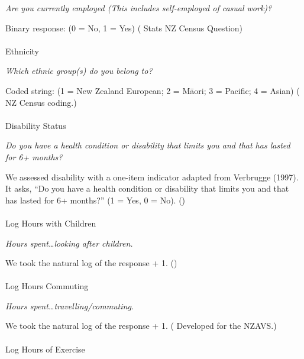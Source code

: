 \documentclass[
  single column]{article}
\makeatletter
\let\oldparagraph\paragraph
\renewcommand{\paragraph}{
    \@ifstar
      \xxxParagraphStar
      \xxxParagraphNoStar
  }
\newcommand{\xxxParagraphStar}[1]{\oldparagraph*{#1}\mbox{}}
\newcommand{\xxxParagraphNoStar}[1]{\oldparagraph{#1}\mbox{}}
\makeatother
\begin{document}
\emph{Are you currently employed (This includes self-employed of casual
work)?}

Binary response: (0 = No, 1 = Yes)
( Stats NZ Census
Question)

\paragraph{Ethnicity}\label{ethnicity}

\emph{Which ethnic group(s) do you belong to?}

Coded string: (1 = New Zealand European; 2 = Māori; 3 = Pacific; 4 =
Asian) ( NZ Census
coding.)

\paragraph{Disability Status}\label{disability-status}

\emph{Do you have a health condition or disability that limits you and
that has lasted for 6+ months?}

We assessed disability with a one-item indicator adapted from Verbrugge
(1997). It asks, ``Do you have a health condition or disability that
limits you and that has lasted for 6+ months?'' (1 = Yes, 0 = No).
()

\paragraph{Log Hours with Children}\label{log-hours-with-children}

\emph{Hours spent\ldots looking after children.}

We took the natural log of the response + 1.
()

\paragraph{Log Hours Commuting}\label{log-hours-commuting}

\emph{Hours spent\ldots travelling/commuting.}

We took the natural log of the response + 1.
( Developed for the
NZAVS.)

\paragraph{Log Hours of Exercise}\label{log-hours-of-exercise}
\end{document}
